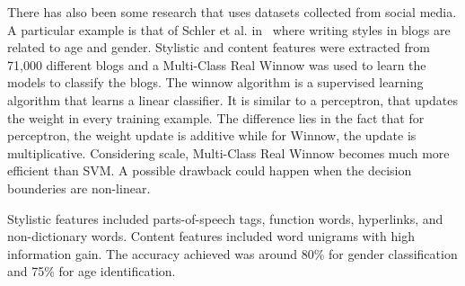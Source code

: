 \documentclass[a4paper]{llncs}
\begin{document}
There has also been some research that uses datasets collected from social media. A particular example is that of Schler et al. in~\cite{schler2006effects} where writing styles in blogs are related to age and gender. Stylistic and content features were extracted from 71,000 different blogs and a Multi-Class Real Winnow was used to learn the models to classify the blogs. The winnow algorithm is a supervised learning algorithm that learns a linear classifier. It is similar to a perceptron, that updates the weight in every training example. The difference lies in the fact that for perceptron, the weight update is additive while for Winnow, the update is multiplicative. Considering scale, Multi-Class Real Winnow becomes much more efficient than SVM. A possible drawback could happen when the decision bounderies are non-linear. 

Stylistic features included parts-of-speech tags, function words, hyperlinks, and non-dictionary words. Content features included word unigrams with high information gain. The accuracy achieved was around 80\% for gender classification and 75\% for age identification.  
\end{document}
